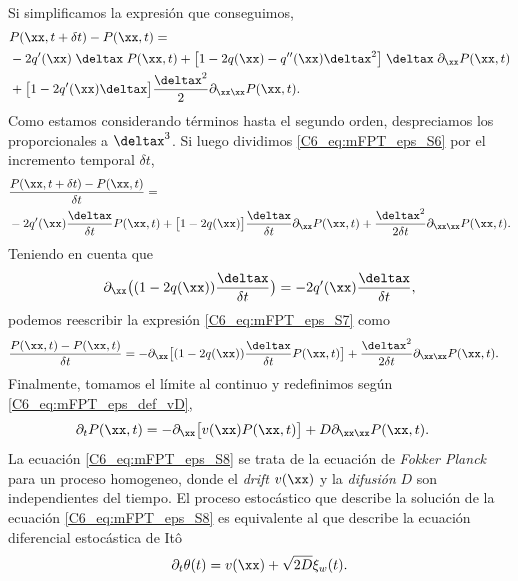 {\begin{align}
\end{align}
Si simplificamos la expresión que conseguimos, 
\begin{align}
     & P( \xx,t + \delta t) - P(\xx,t) = \nonumber \\
     & - 2 q'(\xx) \; \deltax \; P(\xx,t) + \big[ 1- 2 q(\xx) - q''(\xx) \deltax^2 \big] \; \deltax \; \partial_\xx P(\xx,t) \nonumber \\ & +\big[ 1-2 q'(\xx) \deltax \big] \frac{\deltax^2}{2}\partial_{\xx \xx} P(\xx,t)  .
     \label{C6_eq:mFPT_eps_S6}
\end{align}
Como estamos considerando términos hasta el segundo orden, despreciamos los proporcionales a $\deltax^3$. Si luego dividimos \ref{C6_eq:mFPT_eps_S6} por el incremento temporal $\delta t$,
\begin{align}
    & \frac{P( \xx,t + \delta t) - P(\xx,t)}{\delta t}  = \nonumber \\ & - 2 q'(\xx) \frac{\deltax}{\delta t} P(\xx,t) + \big[ 1- 2 q(\xx) \big] \frac{\deltax}{\delta t} \partial_\xx P(\xx,t) +  \frac{\deltax^2}{2 \delta t}\partial_{\xx \xx} P(\xx,t).
    \label{C6_eq:mFPT_eps_S7}
\end{align}
Teniendo en cuenta que 
\begin{align}
    \partial_\xx\big( (1-2q(\xx)) \frac{\deltax}{\delta t} \big) = - 2 q'(\xx) \frac{\deltax}{\delta t},
\end{align}
podemos reescribir la expresión \ref{C6_eq:mFPT_eps_S7} como 
\begin{align}
    \frac{P(\xx,t) - P(\xx,t) }{\delta t} &= - \partial_\xx \big[ (1-2q(\xx)) \frac{\deltax}{\delta t} P(\xx,t) \big] + \frac{\deltax^2}{2 \delta t}\partial_{\xx \xx} P(\xx,t).
\end{align}
Finalmente, tomamos el límite al continuo y redefinimos según \ref{C6_eq:mFPT_eps_def_vD}, 
\begin{align}
   \partial_t P(\xx,t) &= - \partial_\xx \big[ v(\xx) P(\xx,t) \big] + D \partial_{\xx \xx} P(\xx,t).
   \label{C6_eq:mFPT_eps_S8}
\end{align}
La ecuación \ref{C6_eq:mFPT_eps_S8} se trata de la ecuación de \emph{Fokker Planck} para un proceso homogeneo, donde el \emph{drift} $v(\xx)$ y la \emph{difusión} $D$ son independientes del tiempo. El proceso estocástico que describe la solución de la ecuación \ref{C6_eq:mFPT_eps_S8} es equivalente al que describe la ecuación diferencial estocástica de Itô \cite{Gardiner}
\begin{equation}
    \partial_t  \theta(t) =  v(\xx) + \sqrt{2D} \xi_w(t).

\end{equation}}
